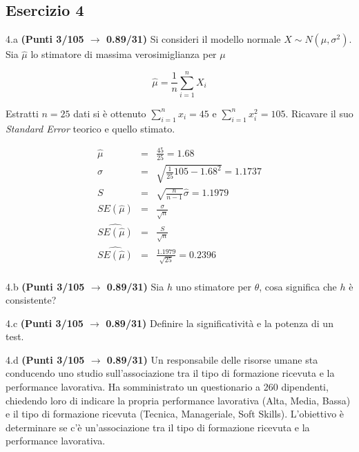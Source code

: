 \documentclass[
  11pt,
]{book}
\theoremstyle{mytheoremstyle}
\theoremstyle{mydefstyle}
\newenvironment{sol}
  {
  \begin{tcolorbox}[enhanced,breakable,arc=0.1mm,boxrule=1pt,colback=white,colframe=iblue,
  title=\bf \fontfamily{lmss}\selectfont \hspace{.5 cm} Soluzione,drop fuzzy shadow]

}{
\end{tcolorbox}
  }
\begin{document}
\subsection{Esercizio 4}\label{esercizio-4-40}

4.a \textbf{(Punti 3/105 \(\rightarrow\) 0.89/31)} Si consideri il modello normale \(X\sim N(\mu,\sigma^2)\). Sia \(\hat\mu\) lo stimatore di massima verosimiglianza per \(\mu\)

\[
  \hat\mu = \frac 1n \sum_{i=1}^n X_i
\]

Estratti \(n=25\) dati si è ottenuto \(\sum_{i=1}^n x_i = 45\) e \(\sum_{i=1}^n x_i^2 = 105\). Ricavare il suo \emph{Standard Error} teorico e quello stimato.

\begin{sol}
\begin{eqnarray*}
  \hat\mu  &=&\frac{45}{25}=1.68\\
  \hat\sigma &=&\sqrt{\frac 1{25}105-1.68^2}=1.1737\\
  S &=&\sqrt{\frac{n}{n-1}}\hat\sigma=1.1979\\
  SE(\hat\mu) &=&  \frac{\sigma}{\sqrt{n}}\\
  \widehat{SE(\hat\mu)} &=& \frac{S}{\sqrt{n}}\\
  \widehat{SE(\hat\mu)} &=& \frac{1.1979}{\sqrt{25}}=0.2396\\
\end{eqnarray*}

\end{sol}

4.b \textbf{(Punti 3/105 \(\rightarrow\) 0.89/31)} Sia \(h\) uno stimatore per \(\theta\), cosa significa che \(h\) è consistente?

4.c \textbf{(Punti 3/105 \(\rightarrow\) 0.89/31)} Definire la significatività e la potenza di un test.

4.d \textbf{(Punti 3/105 \(\rightarrow\) 0.89/31)} Un responsabile delle risorse umane sta conducendo uno studio sull'associazione tra il tipo di formazione ricevuta e la performance lavorativa. Ha somministrato un questionario a 260 dipendenti, chiedendo loro di indicare la propria performance lavorativa (Alta, Media, Bassa) e il tipo di formazione ricevuta (Tecnica, Manageriale, Soft Skills). L'obiettivo è determinare se c'è un'associazione tra il tipo di formazione ricevuta e la performance lavorativa.
\end{document}

